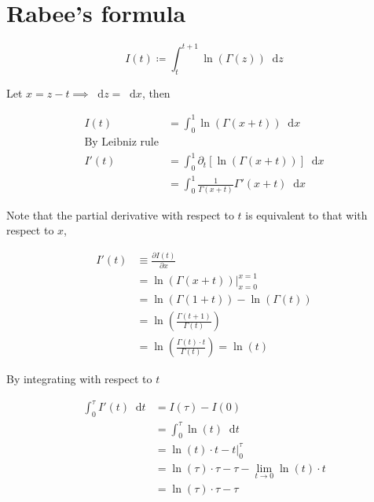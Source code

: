 \documentclass{article}
\title{
    \vspace{2in}
    \textmd{\hmwkTitle}\\
    \vspace{3in}
}
\author{\hmwkAuthorName}
\newcommand*\diff{\mathop{}\!\mathrm{d}}
\begin{document}
\maketitle
\thispagestyle{empty}

\newpage

\setcounter{page}{1}

\section{Rabee's formula}

\begin{equation} \label{It}
    I(t) \coloneqq \int^{t+1}_{t} \ln\left(\Gamma(z)\right) \diff z
\end{equation}

Let $x = z- t \implies \diff z = \diff x$, then

\begin{equation}
    \begin{split}
        I(t) &= \int^1_0 \ln\left(\Gamma(x + t)\right) \diff x \\
        \text{By Leibniz rule}\\
        I'(t) &= \int^1_0 \partial_t\left[\ln\left(\Gamma(x + t)\right)\right] \diff x \\
        &= \int^1_0 \frac{1}{\Gamma(x + t)} \Gamma'(x + t) \diff x 
    \end{split}
\end{equation}

Note that the partial derivative with respect to $t$ is equivalent to that with respect to $x$,

\begin{equation}
    \begin{split}
        I'(t) &\equiv \frac{\partial I(t)}{\partial x} \\
        &= \ln(\Gamma(x + t)) \vert^{x=1}_{x=0} \\
        &= \ln(\Gamma(1 + t)) - \ln(\Gamma(t))\\
        &= \ln\left(\frac{\Gamma(t+1)}{\Gamma(t)}\right) \\
        &= \ln\left(\frac{\Gamma(t) \cdot t}{\Gamma(t)}\right) = \ln(t)
    \end{split}
\end{equation}

By integrating with respect to $t$

\begin{equation} \label{tau_int}
\begin{split}
   \int^{\tau}_{0} I'(t) \diff t &= I(\tau) -  I(0) \\
    &= \int^{\tau}_{0} \ln(t) \diff t \\
    &= \ln(t) \cdot t - t \vert^{\tau}_{0} \\
    &= \ln(\tau) \cdot \tau - \tau - \lim_{t \xrightarrow{} 0} \ln(t) \cdot t \\
    &= \ln(\tau) \cdot \tau - \tau
\end{split}
\end{equation}
\end{document}
